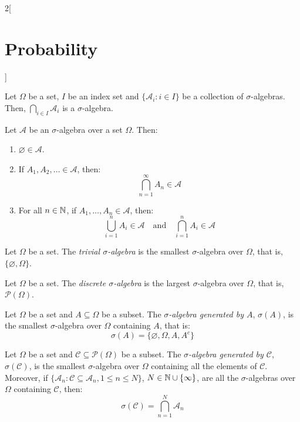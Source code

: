\documentclass[../../../main.tex]{subfiles}
\begin{document}
\begin{multicols}{2}[\section{Probability}]
\begin{definition}
\begin{enumerate}
        \end{enumerate}
    \end{definition}
    \begin{prop}
        Let $\Omega$ be a set, $I$ be an index set and $\{\mathcal{A}_i:i\in I\}$ be a collection of $\sigma$-algebras. Then, $\bigcap_{i\in I} \mathcal{A}_i$ is a $\sigma$-algebra.
    \end{prop}
    \begin{prop}
        Let $\mathcal{A}$ be an $\sigma$-algebra over a set $\Omega$. Then:
        \begin{enumerate}
            \item $\varnothing\in\mathcal{A}$.
            \item If $A_1,A_2,\ldots\in\mathcal{A}$, then: $$\bigcap_{n=1}^\infty A_n\in\mathcal{A}$$
            \item For all $n\in\mathbb{N}$, if $A_1,\ldots,A_n\in\mathcal{A}$, then: $$\bigcup_{i=1}^nA_i\in\mathcal{A}\quad\text{and}\quad\bigcap_{i=1}^nA_i\in\mathcal{A}$$
        \end{enumerate}
    \end{prop}
    \begin{definition}
        Let $\Omega$ be a set. The \textit{trivial $\sigma$-algebra} is the smallest $\sigma$-algebra over $\Omega$, that is, $\{\varnothing,\Omega\}$.
    \end{definition}
    \begin{definition}
        Let $\Omega$ be a set. The \textit{discrete $\sigma$-algebra} is the largest $\sigma$-algebra over $\Omega$, that is, $\mathcal{P}(\Omega)$.
    \end{definition}
    \begin{definition}
        Let $\Omega$ be a set and $A\subseteq\Omega$ be a subset. The \textit{$\sigma$-algebra generated by $A$}, $\sigma(A)$, is the smallest $\sigma$-algebra over $\Omega$ containing $A$, that is: $$\sigma(A)=\{\varnothing,\Omega,A,A^c\}$$
    \end{definition}
    \begin{definition}
        Let $\Omega$ be a set and $\mathcal{C}\subseteq\mathcal{P}(\Omega)$ be a subset. The \textit{$\sigma$-algebra generated by $\mathcal{C}$}, $\sigma(\mathcal{C})$, is the smallest $\sigma$-algebra over $\Omega$ containing all the elements of $\mathcal{C}$. Moreover, if $\{\mathcal{A}_n:\mathcal{C}\subseteq\mathcal{A}_n,1\leq n\leq N\}$, $N\in\mathbb{N}\cup\{\infty\}$, are all the $\sigma$-algebras over $\Omega$ containing $\mathcal{C}$, then:
        $$\sigma(\mathcal{C})=\bigcap_{n=1}^N\mathcal{A}_n$$

\end{definition}
\end{multicols}
\end{document}
